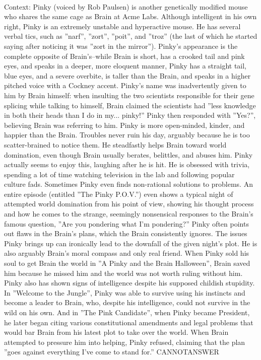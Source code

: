 \documentclass[11pt,a4paper, onecolumn]{article}
\begin{document}
\\ Context: Pinky (voiced by Rob Paulsen) is another genetically modified mouse who shares the same cage as Brain at Acme Labs. Although intelligent in his own right, Pinky is an extremely unstable and hyperactive mouse. He has several verbal tics, such as ''narf'', ''zort'', ''poit'', and ''troz'' (the last of which he started saying after noticing it was ''zort in the mirror''). Pinky's appearance is the complete opposite of Brain's--while Brain is short, has a crooked tail and pink eyes, and speaks in a deeper, more eloquent manner, Pinky has a straight tail, blue eyes, and a severe overbite, is taller than the Brain, and speaks in a higher pitched voice with a Cockney accent. Pinky's name was inadvertently given to him by Brain himself: when insulting the two scientists responsible for their gene splicing while talking to himself, Brain claimed the scientists had ''less knowledge in both their heads than I do in my... pinky!'' Pinky then responded with ''Yes?'', believing Brain was referring to him. Pinky is more open-minded, kinder, and happier than the Brain. Troubles never ruin his day, arguably because he is too scatter-brained to notice them. He steadfastly helps Brain toward world domination, even though Brain usually berates, belittles, and abuses him. Pinky actually seems to enjoy this, laughing after he is hit. He is obsessed with trivia, spending a lot of time watching television in the lab and following popular culture fads. Sometimes Pinky even finds non-rational solutions to problems. An entire episode (entitled ''The Pinky P.O.V.'') even shows a typical night of attempted world domination from his point of view, showing his thought process and how he comes to the strange, seemingly nonsensical responses to the Brain's famous question, ''Are you pondering what I'm pondering?'' Pinky often points out flaws in the Brain's plans, which the Brain consistently ignores. The issues Pinky brings up can ironically lead to the downfall of the given night's plot. He is also arguably Brain's moral compass and only real friend. When Pinky sold his soul to get Brain the world in ''A Pinky and the Brain Halloween'', Brain saved him because he missed him and the world was not worth ruling without him. Pinky also has shown signs of intelligence despite his supposed childish stupidity. In ''Welcome to the Jungle'', Pinky was able to survive using his instincts and become a leader to Brain, who, despite his intelligence, could not survive in the wild on his own. And in ''The Pink Candidate'', when Pinky became President, he later began citing various constitutional amendments and legal problems that would bar Brain from his latest plot to take over the world. When Brain attempted to pressure him into helping, Pinky refused, claiming that the plan ''goes against everything I've come to stand for.'' CANNOTANSWER
\end{document}
